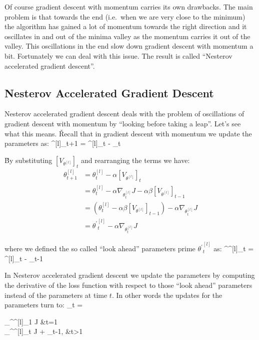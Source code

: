 Of course gradient descent with momentum carries its own drawbacks. The main problem is that towards the end (i.e.\
when we are very close to the minimum) the algorithm has gained a lot of momentum towards the right direction and it
oscillates in and out of the minima valley as the momentum carries it out of the valley. This oscillations in the end
slow down gradient descent with momentum a bit. Fortunately we can deal with this issue. The result is called
``Nesterov accelerated gradient descent''.

\subsection{Nesterov Accelerated Gradient Descent}

Nesterov accelerated gradient descent deals with the problem of oscillations of gradient descent with momentum by
``looking before taking a leap''. Let's see what this means. \v

Recall that in gradient descent with momentum we update the parameters as:
\bse
\theta^{[l]}_{t+1} = \theta^{[l]}_t - \alpha [V_{\theta^{[l]}}]_t
\ese

\v

By substituting $[V_{\theta^{[l]}}]_t $ and rearranging the terms we have:
\begin{align*}
 \theta^{[l]}_{t+1} &= \theta^{[l]}_t - \alpha [V_{\theta^{[l]}}]_t \\ &= \theta^{[l]}_t - \alpha
 \nabla_{\theta^{[l]}_t} J - \alpha \beta [V_{\theta^{[l]}}]_{t-1} \\ &= ( \theta^{[l]}_t - \alpha \beta
 [V_{\theta^{[l]}}]_{t-1}) - \alpha \nabla_{\theta^{[l]}_t} J \\ &= {\theta^{\prime}}^{[l]}_{t} - \alpha
 \nabla_{\theta^{[l]}_t} J
\end{align*}

where we defined the so called ``look ahead'' parameters prime ${\theta^{\prime}}^{[l]}_{t} $ as:
\bse
{\theta^{\prime}}^{[l]}_{t} = \theta^{[l]}_t - \alpha \beta [V_{\theta^{[l]}}]_{t-1}
\ese

In Nesterov accelerated gradient descent we update the parameters by computing the derivative of the loss function
with respect to those ``look ahead'' parameters instead of the parameters at time $t$. In other words the updates for
the parameters turn to:
\bse
[V_{\theta^{[l]}}]_t =
\begin{cases}
\nabla_{{\theta^{\prime}}^{[l]}_{1}} J &t=1\\
\nabla_{{\theta^{\prime}}^{[l]}_{t}} J + \beta [V_{\theta^{[l]}}]_{t-1}, &t>1
\end{cases}
\ese

